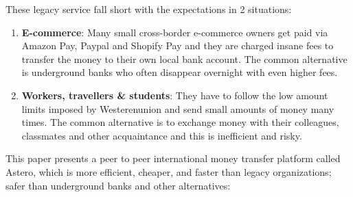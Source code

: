 \documentclass[letterpaper,twocolumn,10pt]{article}
\begin{document}
These legacy service fall short with the expectations in 2 situations:

\begin{enumerate}
    \item \textbf{E-commerce}: Many small cross-border e-commerce owners get paid via Amazon Pay, Paypal and Shopify Pay and they are charged insane fees to transfer the money to their own local bank account. The common alternative is underground banks who often disappear overnight with even higher fees.
    \item \textbf{Workers, travellers \& students}: They have to follow the low amount limits imposed by Westerenunion and send small amounts of money many times. The common alternative is to exchange money with their colleagues, classmates and other acquaintance and this is inefficient and risky.
\end{enumerate} 
This paper presents a peer to peer international money transfer platform called Astero, which is more efficient, cheaper, and faster than legacy organizations; safer than underground banks and other alternatives:

\begin{table}[h!]
\caption{Comparisons of international money transfer solutions}
\label{table:1}
\end{table}
\end{document}
